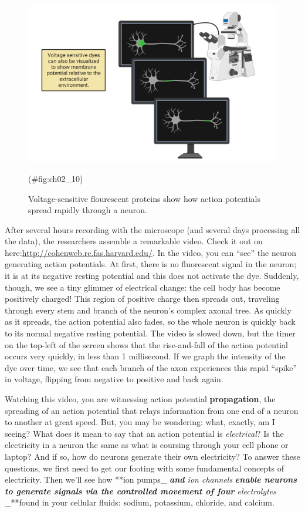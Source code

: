 \documentclass[
]{book}
\begin{document}
\begin{figure}

{\centering \includegraphics[width=0.8\linewidth]{images/ch02/02_10} 

}

\caption{Voltage-sensitive flourescent proteins show how action potentials spread rapidly through a neuron.}(\#fig:ch02_10)
\end{figure}

After several hours recording with the microscope (and several days processing all the data), the researchers assemble a remarkable video. Check it out on here:\url{http://cohenweb.rc.fas.harvard.edu/}. In the video, you can ``see'' the neuron generating action potentials. At first, there is no fluorescent signal in the neuron; it is at its negative resting potential and this does not activate the dye. Suddenly, though, we see a tiny glimmer of electrical change: the cell body has become positively charged! This region of positive charge then spreads out, traveling through every stem and branch of the neuron's complex axonal tree. As quickly as it spreads, the action potential also fades, so the whole neuron is quickly back to its normal negative resting potential. The video is slowed down, but the timer on the top-left of the screen shows that the rise-and-fall of the action potential occurs very quickly, in less than 1 millisecond. If we graph the intensity of the dye over time, we see that each branch of the axon experiences this rapid ``spike'' in voltage, flipping from negative to positive and back again.

Watching this video, you are witnessing action potential \textbf{propagation}, the spreading of an action potential that relays information from one end of a neuron to another at great speed. But, you may be wondering: what, exactly, am I seeing? What does it mean to say that an action potential is \emph{electrical}? Is the electricity in a neuron the same as what is coursing through your cell phone or laptop? And if so, how do neurons generate their own electricity? To answer these questions, we first need to get our footing with some fundamental concepts of electricity. Then we'll see how **ion pumps\_ \emph{\textbf{and }ion channels} \emph{\textbf{enable neurons to generate signals via the controlled movement of four }electrolytes} \_**found in your cellular fluids: sodium, potassium, chloride, and calcium.
\end{document}
